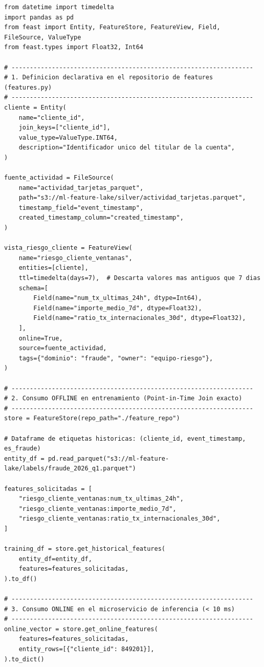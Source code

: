 \begin{lstlisting}[style=python, caption={Definición declarativa y consumo dual (histórico vs.\ online) de características en Feast.}, label={lst:feast-feature-store}]
from datetime import timedelta
import pandas as pd
from feast import Entity, FeatureStore, FeatureView, Field, FileSource, ValueType
from feast.types import Float32, Int64

# ------------------------------------------------------------------
# 1. Definicion declarativa en el repositorio de features (features.py)
# ------------------------------------------------------------------
cliente = Entity(
    name="cliente_id",
    join_keys=["cliente_id"],
    value_type=ValueType.INT64,
    description="Identificador unico del titular de la cuenta",
)

fuente_actividad = FileSource(
    name="actividad_tarjetas_parquet",
    path="s3://ml-feature-lake/silver/actividad_tarjetas.parquet",
    timestamp_field="event_timestamp",
    created_timestamp_column="created_timestamp",
)

vista_riesgo_cliente = FeatureView(
    name="riesgo_cliente_ventanas",
    entities=[cliente],
    ttl=timedelta(days=7),  # Descarta valores mas antiguos que 7 dias
    schema=[
        Field(name="num_tx_ultimas_24h", dtype=Int64),
        Field(name="importe_medio_7d", dtype=Float32),
        Field(name="ratio_tx_internacionales_30d", dtype=Float32),
    ],
    online=True,
    source=fuente_actividad,
    tags={"dominio": "fraude", "owner": "equipo-riesgo"},
)

# ------------------------------------------------------------------
# 2. Consumo OFFLINE en entrenamiento (Point-in-Time Join exacto)
# ------------------------------------------------------------------
store = FeatureStore(repo_path="./feature_repo")

# Dataframe de etiquetas historicas: (cliente_id, event_timestamp, es_fraude)
entity_df = pd.read_parquet("s3://ml-feature-lake/labels/fraude_2026_q1.parquet")

features_solicitadas = [
    "riesgo_cliente_ventanas:num_tx_ultimas_24h",
    "riesgo_cliente_ventanas:importe_medio_7d",
    "riesgo_cliente_ventanas:ratio_tx_internacionales_30d",
]

training_df = store.get_historical_features(
    entity_df=entity_df,
    features=features_solicitadas,
).to_df()

# ------------------------------------------------------------------
# 3. Consumo ONLINE en el microservicio de inferencia (< 10 ms)
# ------------------------------------------------------------------
online_vector = store.get_online_features(
    features=features_solicitadas,
    entity_rows=[{"cliente_id": 849201}],
).to_dict()
\end{lstlisting}

